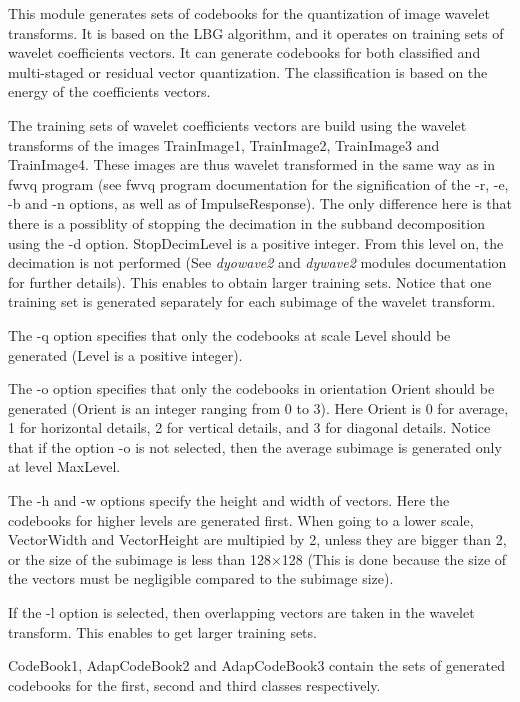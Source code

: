This module generates sets of codebooks for the quantization 
of image wavelet transforms. 
It is based on the LBG algorithm, 
and it operates on training sets of wavelet coefficients vectors. 
It can generate codebooks for both classified and multi-staged 
or residual vector quantization. 
The classification is based on the energy of the coefficients vectors. 

The training sets of wavelet coefficients vectors are build using the 
wavelet transforms of the images TrainImage1, TrainImage2, TrainImage3 
and TrainImage4. These images are thus wavelet transformed in the same 
way as in fwvq program (see fwvq program documentation for the 
signification of the -r, -e, -b and -n options, as well as of 
ImpulseResponse). The only difference here is that there is a possiblity 
of stopping the decimation in the subband decomposition using the -d 
option. StopDecimLevel is a positive integer. From this level on, 
the decimation is not performed (See {\em dyowave2} and {\em dywave2} modules 
documentation for further details). This enables to obtain larger 
training sets. Notice that one training set is generated 
separately for each subimage of the wavelet transform. 

The -q option specifies that only the codebooks at scale Level 
should be generated (Level is a positive integer). 

The -o option specifies that only the codebooks in orientation 
Orient should be generated (Orient is an integer ranging from 0 to 3). 
Here Orient is 0 for average, 1 for horizontal details, 2 for vertical 
details, and 3 for diagonal details. Notice that if the option -o 
is not selected, then the average subimage is generated only at level 
MaxLevel. 

The -h and -w options specify the height and width of vectors. 
Here the codebooks for higher levels are generated first. 
When going to a lower scale, VectorWidth and VectorHeight are multipied 
by 2, unless they are bigger than 2, or the size of the subimage 
is less than 128$\times$128 (This is done because the size of the 
vectors must be negligible compared to the subimage size). 

If the -l option is selected, then overlapping vectors are taken in the 
wavelet transform. This enables to get larger training sets. 

CodeBook1, AdapCodeBook2 and AdapCodeBook3 contain the sets of generated 
codebooks for the first, second and third classes respectively. 

